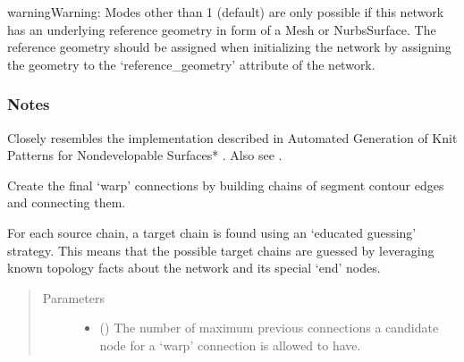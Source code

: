 \documentclass[letterpaper,10pt,english]{sphinxmanual}
\begin{document}
\begin{fulllineitems}
\begin{fulllineitems}
\begin{quote}
\begin{description}
\end{description}\end{quote}

\begin{sphinxadmonition}{warning}{Warning:}
Modes other than \sphinxhyphen{}1 (default) are only possible if this network has an
underlying reference geometry in form of a Mesh or NurbsSurface. The
reference geometry  should be assigned when initializing the network by
assigning the geometry to the ‘reference\_geometry’ attribute of the
network.
\end{sphinxadmonition}
\subsubsection*{Notes}

Closely resembles the implementation described in Automated Generation
of Knit Patterns for Non\sphinxhyphen{}developable Surfaces* \sphinxfootnotemark[1]. Also see  \sphinxfootnotemark[2].

\end{fulllineitems}


\begin{fulllineitems}
\label{\detokenize{cockatoo:cockatoo.KnitNetwork.create_final_warp_connections}}
Create the final ‘warp’ connections by building chains of segment
contour edges and connecting them.

For each source chain, a target chain is found using an
‘educated guessing’ strategy. This means that the possible target chains
are guessed by leveraging known topology facts about the network and its
special ‘end’ nodes.
\begin{quote}\begin{description}
\item[{Parameters}] \leavevmode\begin{itemize}
\item {} 
 (\sphinxstyleliteralemphasis{\sphinxupquote{, }}) \textendash{} 
The number of maximum previous connections a candidate node for a
‘warp’ connection is allowed to have.


\end{itemize}
\end{description}
\end{quote}
\end{fulllineitems}
\end{fulllineitems}
\end{document}

